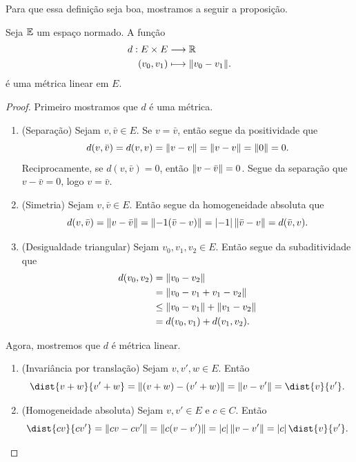 Para que essa definição seja boa, mostramos a seguir a proposição.

\begin{prop}
Seja $\mathbb{E}$ um espaço normado. A função
	\begin{align*}
	{d}: {E \times E} &\longrightarrow {\mathbb{R}} \\{(v_0,v_1)} &\longmapsto {\left\Vert{v_0 - v_1}\right\Vert}.
	\end{align*}
é uma métrica linear em $E$.
\end{prop}
\begin{proof}
Primeiro mostramos que $d$ é uma métrica.
	\begin{enumerate}
	\item (Separação) Sejam $v,\bar v \in E$. Se $v = \bar v$, então segue da positividade que
	\begin{equation*}
	d(v,\bar v) = d(v,v) = \left\Vert{v - v}\right\Vert = \left\Vert{v-v}\right\Vert=\left\Vert{0}\right\Vert=0.
	\end{equation*}
Reciprocamente, se $d(v,\bar v)=0$, então $\left\Vert{v-\bar v}\right\Vert=0$. Segue da separação que $v-\bar v=0$, logo $v=\bar v$.

	\item (Simetria)  Sejam $v,\bar v \in E$. Então segue da homogeneidade absoluta que
	\begin{equation*}
	d(v,\bar v)=\left\Vert{v-\bar v}\right\Vert=\left\Vert{-1(\bar v -v)}\right\Vert=\left\vert{-1}\right\vert\left\Vert{\bar v - v}\right\Vert=d(\bar v,v).
	\end{equation*}
	
	\item (Desigualdade triangular) Sejam $v_0,v_1,v_2 \in E$. Então segue da subaditividade que
	\begin{align*}
	d(v_0,v_2) &= \left\Vert{v_0-v_2}\right\Vert \\
		&=\left\Vert{v_0-v_1+v_1-v_2}\right\Vert \\
		&\leq \left\Vert{v_0-v_1}\right\Vert+\left\Vert{v_1-v_2}\right\Vert \\
		&=d(v_0,v_1)+d(v_1,v_2).
	\end{align*}	
	\end{enumerate}
Agora, mostremos que $d$ é métrica linear.
	\begin{enumerate}
	\item (Invariância por translação) Sejam $v,v',w \in E$. Então
		\begin{equation*}
		\dist{v+w}{v'+w} = \nor{(v+w) - (v'+w)} = \nor{v-v'} = \dist{v}{v'}.
		\end{equation*}
	
	\item (Homogeneidade absoluta) Sejam $v,v' \in E$ e $c \in C$. Então
		\begin{equation*}
		\dist{cv}{cv'} = \nor{cv-cv'} = \nor{c(v-v')} = \abs{c}\nor{v-v'} = \abs{c}\dist{v}{v'}. \qedhere
		\end{equation*}
	\end{enumerate}
\end{proof}

